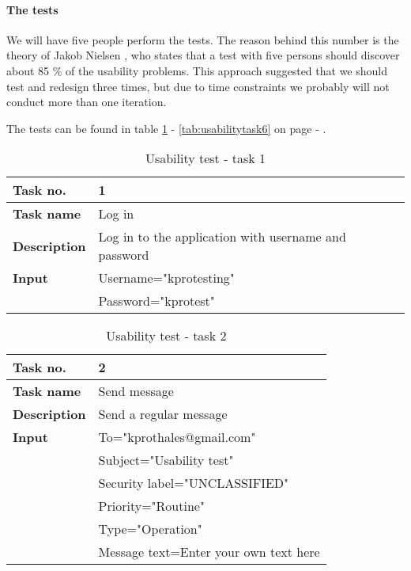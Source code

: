 \paragraph{The tests}\hfill
\newline
We will have five people perform the tests. The reason behind this number is the theory of Jakob Nielsen \cite{bib:useit}, who states that a test with five persons should discover about 85 \% of the usability problems. This approach suggested that we should test and redesign three times, but due to time constraints we probably will not conduct more than one iteration.  
\newline

The tests can be found in table \ref{tab:usabilitytask1} - \ref{tab:usabilitytask6} on page \pageref{tab:usabilitytask1} - \pageref{tab:usabilitytask6}.

\begin{table}[h!]
\begin{center}
\begin{tabular}{>{\bfseries}l|l} \hline
Task no.&1\\ \hline
Task name&Log in\\ \hline
Description&Log in to the application with username and password\\ \hline
Input&Username="kprotesting" \\
&Password="kprotest"\\ \hline
\end{tabular}
\end{center}
\caption{Usability test - task 1} \label{tab:usabilitytask1}
\end{table}

\begin{table}[h!]
\begin{center}
\begin{tabular}{>{\bfseries}l|l}\hline
Task no.&2\\ \hline
Task name&Send message\\ \hline
Description&Send a regular message\\ \hline
Input&To="kprothales@gmail.com" \\
&Subject="Usability test"\\
&Security label="UNCLASSIFIED"\\ 
&Priority="Routine"\\
&Type="Operation"\\
&Message text=Enter your own text here\\ \hline
\end{tabular}
\end{center}
\caption{Usability test - task 2} \label{tab:usabilitytask2}
\end{table}


